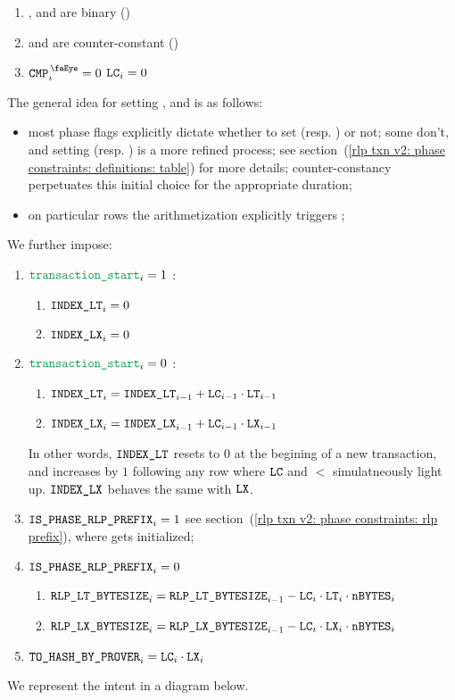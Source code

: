 \begin{enumerate}
    \item \lc{}, \lt{} and \lx{} are binary \quad (\sanityCheck)
    \item \lt{} and \lx{} are counter-constant \quad (\sanityCheck)
    \item \If $\isCmp  _{i} = 0$ \Then $\texttt{LC} _{i} = 0$
\end{enumerate}
\saNote{}
The general idea for setting \lc{}, \lt{} and \lx{} is as follows:
\begin{itemize}
    \item
        most phase flags explicitly dictate whether to set \lt{} (resp. \lx{}) or not;
        some don't, and setting \lt{} (resp. \lx{}) is a more refined process;
        see section~(\ref{rlp txn v2: phase constraints: definitions: table})
        for more details;
        counter-constancy perpetuates this initial choice for the appropriate duration;
    \item
        on particular rows the arithmetization explicitly triggers \lc{};
\end{itemize}

\noindent We further impose:
\begin{enumerate}
    \item \If $\locTransactionStart _{i} = 1$ \Then:
        \begin{enumerate}
            \item $\texttt{INDEX\_LT} _{i} = 0$
            \item $\texttt{INDEX\_LX} _{i} = 0$
        \end{enumerate}
    \item \If $\locTransactionStart _{i} = 0$ \Then:
        \begin{enumerate}
            \item $\texttt{INDEX\_LT} _{i} = \texttt{INDEX\_LT} _{i - 1} + \texttt{LC} _{i - 1} \cdot \texttt{LT} _{i - 1}$
            \item $\texttt{INDEX\_LX} _{i} = \texttt{INDEX\_LX} _{i - 1} + \texttt{LC} _{i - 1} \cdot \texttt{LX} _{i - 1}$
        \end{enumerate}
        \saNote{}
        In other words, $\texttt{INDEX\_LT}$ resets to $0$ at the begining of a new transaction,
        and increases by $1$ following any row where $\texttt{LC}$ and $\lt$ simulatneously light up.
        $\texttt{INDEX\_LX}$ behaves the same with $\texttt{LX}$.
    \item \If $\texttt{IS\_PHASE\_RLP\_PREFIX} _{i} = 1$ \Then
        see section~(\ref{rlp txn v2: phase constraints: rlp prefix}),
        where \phaseRlpPrefix{} gets initialized;
    \item \If $\texttt{IS\_PHASE\_RLP\_PREFIX} _{i} = 0$ \Then
        \begin{enumerate}
            \item $\texttt{RLP\_LT\_BYTESIZE} _{i} = \texttt{RLP\_LT\_BYTESIZE} _{i - 1} - \texttt{LC} _{i} \cdot \texttt{LT} _{i} \cdot\texttt{nBYTES} _{i}$
            \item $\texttt{RLP\_LX\_BYTESIZE} _{i} = \texttt{RLP\_LX\_BYTESIZE} _{i - 1} - \texttt{LC} _{i} \cdot \texttt{LX} _{i} \cdot\texttt{nBYTES} _{i}$
        \end{enumerate}
    \item $\texttt{TO\_HASH\_BY\_PROVER} _{i} = \texttt{LC} _{i} \cdot \texttt{LX} _{i}$
\end{enumerate}
We represent the intent in a diagram below.


